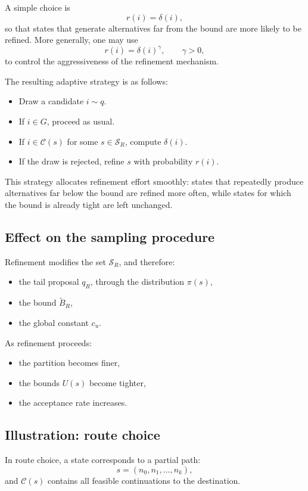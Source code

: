 \documentclass[11pt]{article}
\begin{document}
A simple choice is
\[
r(i) = \delta(i),
\]
so that states that generate alternatives far from the bound are more likely to be refined. More generally, one may use
\[
r(i) = \delta(i)^\gamma,
\qquad \gamma > 0,
\]
to control the aggressiveness of the refinement mechanism.

The resulting adaptive strategy is as follows:
\begin{itemize}
\item Draw a candidate $i \sim q$.
\item If $i \in G$, proceed as usual.
\item If $i \in \mathcal{C}(s)$ for some $s \in \mathcal{S}_R$, compute $\delta(i)$.
\item If the draw is rejected, refine $s$ with probability $r(i)$.
\end{itemize}

This strategy allocates refinement effort smoothly: states that repeatedly produce alternatives far below the bound are refined more often, while states for which the bound is already tight are left unchanged.

\subsection{Effect on the sampling procedure}

Refinement modifies the set $\mathcal{S}_R$, and therefore:
\begin{itemize}
\item the tail proposal $q_R$, through the distribution $\pi(s)$,
\item the bound $\widetilde{B}_R$,
\item the global constant $c_u$.
\end{itemize}

As refinement proceeds:
\begin{itemize}
\item the partition becomes finer,
\item the bounds $U(s)$ become tighter,
\item the acceptance rate increases.
\end{itemize}

\subsection{Illustration: route choice}

In route choice, a state corresponds to a partial path:
\[
s = (n_0, n_1, \dots, n_k),
\]
and $\mathcal{C}(s)$ contains all feasible continuations to the destination.
\end{document}
